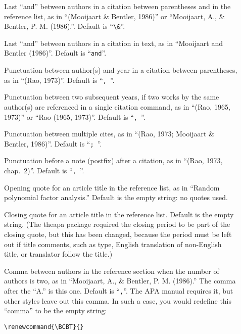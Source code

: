 \documentclass{article}
\newcommand{\pkg}[1]{\textsf{#1}}%
\newcommand{\cmd}[1]{\texttt{\string#1}}%
\newcommand{\flqq}{\raisebox{2pt}{\ensuremath{{\scriptscriptstyle\ll}}}}%
\newcommand{\frqq}{\raisebox{2pt}{\ensuremath{{\scriptscriptstyle\gg}}}}%
\begin{document}
\begin{description}
  \item[\cmd{\BBAA}] Last ``and'' between authors in a citation
      between parentheses and in the reference list, as in
      ``(Mooijaart \& Bentler, 1986)'' or ``Mooijaart, A., \&
      Bentler, P. M. (1986).''. Default is ``\verb+\&+''.

  \item[\cmd{\BBAB}] Last ``and'' between authors in a citation in text,
      as in ``Mooijaart and Bentler (1986)''. Default is ``\verb+and+''.

  \item[\cmd{\BBAY}] Punctuation between author(s) and year in a citation
      between parentheses, as in ``(Rao, 1973)''. Default is ``\verb+, +''.

  \item[\cmd{\BBYY}] \label{cmd:BBYY}
      Punctuation between two subsequent years, if two works
      by the same author(s) are referenced in a single citation command,
      as in ``(Rao, 1965, 1973)'' or ``Rao (1965, 1973)''.
      Default is ``\verb+, +''.

  \item[\cmd{\BBC}] Punctuation between multiple cites, as in
      ``(Rao, 1973; Mooijaart \& Bentler, 1986)''.
      Default is ``\verb+; +''.

  \item[\cmd{\BBN}] Punctuation before a note (postfix) after
      a citation, as in ``(Rao, 1973, chap.~2)''.
      Default is ``\verb+, +''.

  \item[\cmd{\BBOQ}] Opening quote for an article title in the
      reference list, as in
      ``\flqq Random polynomial factor analysis.\frqq'' Default is
      the empty string: no quotes used.

  \item[\cmd{\BBCQ}] Closing quote for an article title in the
      reference list. Default is the empty string.
      (The \pkg{theapa} package required the closing period to be part
      of the closing quote, but this has been
      changed, because the period must be left out if title comments,
      such as type, English translation of non-English title, or
      translator follow the title.)

  \item[\cmd{\BCBT}] Comma between authors in the reference section when
      the number of authors is two, as in
      ``Mooijaart, A., \& Bentler, P. M. (1986).'' The comma
      after the ``A.'' is this one. Default is ``\verb+,+''.
      The APA manual requires it, but other styles leave out this
      comma. In such a case, you would redefine this ``comma'' to
      be the empty string:
\begin{verbatim}
\renewcommand{\BCBT}{}
\end{verbatim}


\end{description}
\end{document}
